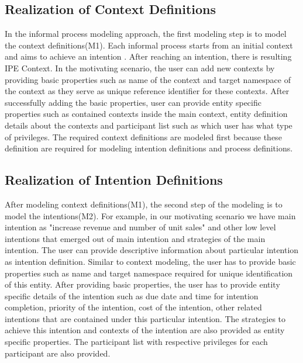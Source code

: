 \subsection{Realization of Context Definitions}
In the informal process modeling approach, the first modeling step is to model the context definitions(M1). Each informal process starts from an initial context and aims to achieve an intention \cite{Sungur2014a}. After reaching an intention, there is resulting IPE Context. In the motivating scenario, the user can add new contexts by providing basic properties such as name of the context and target namespace of the context as they serve as unique reference identifier for these contexts. After successfully adding the basic properties, user can provide entity specific properties such as contained contexts inside the main context, entity definition details about the contexts and participant list such as which user has what type of privileges. The required context definitions are modeled first because these definition are required for modeling intention definitions and process definitions.  

\subsection{Realization of Intention Definitions}
After modeling context definitions(M1), the second step of the modeling is to model the intentions(M2). For example, in our motivating scenario we have main intention as "increase revenue and number of unit sales" and other low level intentions that emerged out of main intention and strategies of the main intention. The user can provide descriptive information about particular intention as intention definition. Similar to context modeling, the user has to provide basic properties such as name and target namespace required for unique identification of this entity. After providing basic properties, the user has to provide entity specific details of the intention such as due date and time for intention completion, priority of the intention, cost of the intention, other related intentions that are contained under this particular intention. The strategies to achieve this intention and contexts of the intention are also provided as entity specific properties. The participant list with respective privileges for each participant are also provided. 

